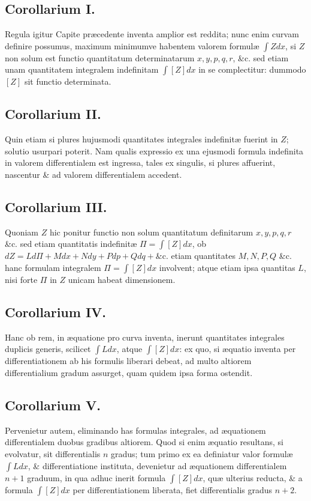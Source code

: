 \subsection*{Corollarium I.}
Regula igitur Capite præcedente inventa amplior est reddita; nunc enim curvam definire possumus, maximum minimumve habentem valorem formulæ $\int Zdx$, si $Z$ non solum est functio quantitatum determinatarum $x,y,p,q,r$, \&c. sed etiam unam quantitatem integralem indefinitam $\int[Z]dx$ in se complectitur: dummodo $[Z]$ sit functio determinata.
\subsection*{Corollarium II.}
Quin etiam si plures hujusmodi quantitates integrales indefinitæ fuerint in $Z$; solutio usurpari poterit. Nam qualis expressio ex una ejusmodi formula indefinita in valorem differentialem est ingressa, tales ex singulis, si plures affuerint, nascentur \& ad valorem differentialem accedent.
\subsection*{Corollarium III.}
Quoniam $Z$ hic ponitur functio non solum quantitatum definitarum $x,y,p,q,r$ \&c. sed etiam quantitatis indefinitæ $\Pi=\int[Z]dx$, ob $dZ=Ld\Pi+Mdx+Ndy+Pdp+Qdq+\text{\&c.}$ etiam quantitates $M,N,P,Q$ \&c. hanc formulam integralem $\Pi=\int[Z]dx$ involvent; atque etiam ipsa quantitas $L$, nisi forte $\Pi$ in $Z$ unicam habeat dimensionem.
\subsection*{Corollarium IV.}
Hanc ob rem, in æquatione pro curva inventa, inerunt quantitates integrales duplicis generis, scilicet $\int Ldx$, atque $\int[Z]dx$: ex quo, si æquatio inventa per differentiationem ab his formulis liberari debeat, ad multo altiorem differentialium gradum assurget, quam quidem ipsa forma ostendit.
\subsection*{Corollarium V.}
Pervenietur autem, eliminando has formulas integrales, ad æquationem differentialem duobus gradibus altiorem. Quod si enim æquatio resultans, si evolvatur, sit differentialis $n$ gradus; tum primo ex ea definiatur valor formulæ $\int Ldx$, \& differentiatione instituta, devenietur ad æquationem differentialem $n+1$ graduum, in qua adhuc inerit formula $\int[Z]dx$, quæ ulterius reducta, \& a formula $\int[Z]dx$ per differentiationem liberata, fiet differentialis gradus $n+2$.
